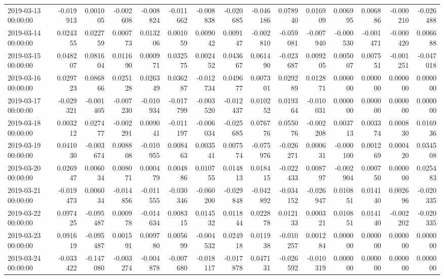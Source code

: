 \begin{tabular}{lrrrrrrrrrrrrrr}
2019-03-13 00:00:00 & -0.019913 & 0.001005 & -0.002608 & -0.008824 & -0.011662 & -0.008838 & -0.020685 & -0.046186 & 0.078940 & 0.016909 & 0.006995 & 0.006886 & -0.000210 & -0.026488 \\
2019-03-14 00:00:00 & 0.024355 & 0.022759 & 0.000773 & 0.013206 & 0.001059 & 0.009042 & 0.009147 & -0.002810 & -0.059081 & -0.007940 & -0.000530 & -0.001471 & -0.000420 & 0.006688 \\
2019-03-15 00:00:00 & 0.048207 & 0.081604 & 0.011690 & 0.000971 & 0.032575 & 0.002452 & 0.043667 & 0.061490 & -0.023687 & 0.009205 & 0.005007 & 0.007551 & -0.001251 & -0.047018 \\
2019-03-16 00:00:00 & 0.029723 & 0.086866 & 0.025128 & 0.026349 & 0.036287 & -0.012734 & 0.049677 & 0.007301 & 0.029289 & 0.012871 & 0.000000 & 0.000000 & 0.000000 & 0.000000 \\
2019-03-17 00:00:00 & -0.029321 & -0.001405 & -0.007230 & -0.010934 & -0.017799 & -0.003520 & -0.012437 & 0.010252 & 0.019364 & -0.010031 & 0.000000 & 0.000000 & 0.000000 & 0.000000 \\
2019-03-18 00:00:00 & 0.003212 & 0.027477 & -0.002291 & 0.009041 & -0.011197 & -0.006034 & -0.025685 & 0.076776 & 0.055076 & -0.002208 & 0.003713 & 0.003374 & 0.000830 & 0.016936 \\
2019-03-19 00:00:00 & 0.041030 & -0.003674 & 0.008808 & -0.010955 & 0.008463 & 0.003541 & 0.007574 & -0.075976 & -0.026271 & 0.000631 & -0.000100 & 0.001269 & 0.000420 & 0.034508 \\
2019-03-20 00:00:00 & 0.026947 & 0.006034 & 0.008071 & 0.000479 & 0.004886 & 0.010755 & 0.014813 & 0.018415 & -0.022433 & 0.008797 & -0.002904 & 0.000750 & 0.000000 & 0.025483 \\
2019-03-21 00:00:00 & -0.019473 & 0.006034 & -0.014856 & -0.011555 & -0.030346 & -0.060200 & -0.029848 & -0.042892 & -0.034152 & -0.026947 & 0.010851 & 0.014140 & 0.002696 & -0.020335 \\
2019-03-22 00:00:00 & 0.097425 & -0.095487 & 0.000978 & -0.014634 & 0.008315 & 0.014532 & 0.011844 & 0.022878 & 0.012133 & 0.000321 & 0.010851 & 0.014140 & -0.002202 & -0.020335 \\
2019-03-23 00:00:00 & 0.091619 & -0.095487 & 0.001591 & 0.009780 & 0.005699 & -0.004532 & 0.024918 & 0.011938 & -0.010257 & 0.001284 & 0.000000 & 0.000000 & 0.000000 & 0.000000 \\
2019-03-24 00:00:00 & -0.033422 & -0.147080 & -0.003274 & -0.004878 & -0.007680 & -0.018117 & -0.017878 & 0.047131 & -0.026592 & -0.010319 & 0.000000 & 0.000000 & 0.000000 & 0.000000 \\

\end{tabular}
